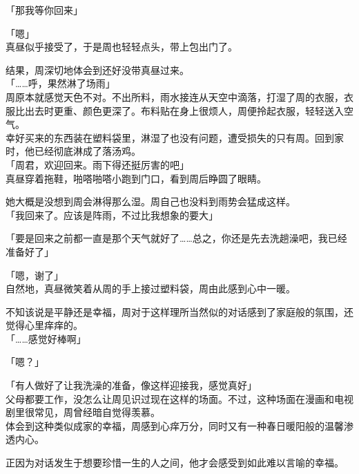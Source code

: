 「那我等你回来」

「嗯」\\

真昼似乎接受了，于是周也轻轻点头，带上包出门了。\\

\vspace{2\baselineskip}

结果，周深切地体会到还好没带真昼过来。\\

「……呼，果然淋了场雨」\\

周原本就感觉天色不对。不出所料，雨水接连从天空中滴落，打湿了周的衣服，衣服比出去时更重、颜色更深了。布料贴在身上很烦人，周便拎起衣服，轻轻送入空气。\\

幸好买来的东西装在塑料袋里，淋湿了也没有问题，遭受损失的只有周。回到家时，他已经彻底淋成了落汤鸡。\\

「周君，欢迎回来。雨下得还挺厉害的吧」\\

真昼穿着拖鞋，啪嗒啪嗒小跑到门口，看到周后睁圆了眼睛。

她大概是没想到周会淋得那么湿。周自己也没料到雨势会猛成这样。\\

「我回来了。应该是阵雨，不过比我想象的要大」

「要是回来之前都一直是那个天气就好了……总之，你还是先去洗趟澡吧，我已经准备好了」

「嗯，谢了」\\

自然地，真昼微笑着从周的手上接过塑料袋，周由此感到心中一暖。

不知该说是平静还是幸福，周对于这样理所当然似的对话感到了家庭般的氛围，还觉得心里痒痒的。\\

「……感觉好棒啊」

「嗯？」

「有人做好了让我洗澡的准备，像这样迎接我，感觉真好」\\

父母都要工作，没怎么让周见识过现在这样的场面。不过，这种场面在漫画和电视剧里很常见，周曾经暗自觉得羡慕。\\

体会到这种类似成家的幸福，周感到心痒万分，同时又有一种春日暖阳般的温馨渗透内心。

正因为对话发生于想要珍惜一生的人之间，他才会感受到如此难以言喻的幸福。\\

